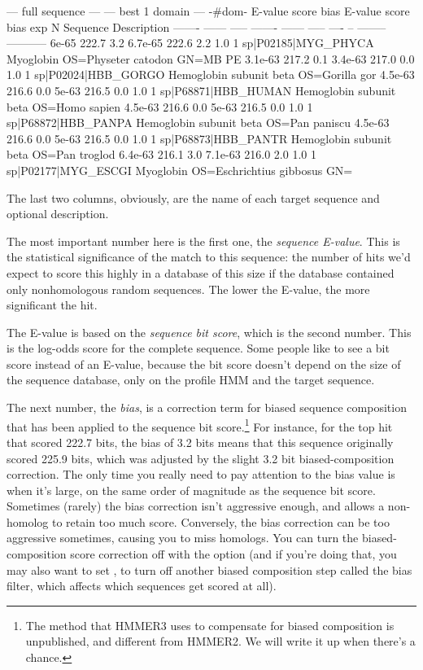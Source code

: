 \begin{sreoutput}
   --- full sequence ---   --- best 1 domain ---    -#dom-
    E-value  score  bias    E-value  score  bias    exp  N  Sequence              Description
    ------- ------ -----    ------- ------ -----   ---- --  --------              -----------
      6e-65  222.7   3.2    6.7e-65  222.6   2.2    1.0  1  sp|P02185|MYG_PHYCA   Myoglobin OS=Physeter catodon GN=MB PE
    3.1e-63  217.2   0.1    3.4e-63  217.0   0.0    1.0  1  sp|P02024|HBB_GORGO   Hemoglobin subunit beta OS=Gorilla gor
    4.5e-63  216.6   0.0      5e-63  216.5   0.0    1.0  1  sp|P68871|HBB_HUMAN   Hemoglobin subunit beta OS=Homo sapien
    4.5e-63  216.6   0.0      5e-63  216.5   0.0    1.0  1  sp|P68872|HBB_PANPA   Hemoglobin subunit beta OS=Pan paniscu
    4.5e-63  216.6   0.0      5e-63  216.5   0.0    1.0  1  sp|P68873|HBB_PANTR   Hemoglobin subunit beta OS=Pan troglod
    6.4e-63  216.1   3.0    7.1e-63  216.0   2.0    1.0  1  sp|P02177|MYG_ESCGI   Myoglobin OS=Eschrichtius gibbosus GN=
 \end{sreoutput}

The last two columns, obviously, are the name of each target sequence
and optional description.

The most important number here is the first one, the \emph{sequence
E-value}. This is the statistical significance of the match to this
sequence: the number of hits we'd expect to score this highly in a
database of this size if the database contained only nonhomologous
random sequences. The lower the E-value, the more significant the hit.

The E-value is based on the \emph{sequence bit score}, which is the
second number. This is the log-odds score for the complete sequence.
Some people like to see a bit score instead of an E-value, because the
bit score doesn't depend on the size of the sequence database, only on
the profile HMM and the target sequence.

The next number, the \emph{bias}, is a correction term for biased
sequence composition that has been applied to the sequence bit
score.\footnote{The method that HMMER3 uses to compensate for biased
  composition is unpublished, and different from HMMER2. We will write
  it up when there's a chance.} For instance, for the top hit
 that scored 222.7 bits, the bias of 3.2 bits means
that this sequence originally scored 225.9 bits, which was adjusted by
the slight 3.2 bit biased-composition correction. The only time you
really need to pay attention to the bias value is when it's large, on
the same order of magnitude as the sequence bit score. Sometimes
(rarely) the bias correction isn't aggressive enough, and allows a
non-homolog to retain too much score. Conversely, the bias correction
can be too aggressive sometimes, causing you to miss homologs. You can
turn the biased-composition score correction off with the
 option (and if you're doing that, you may also want
to set , to turn off another biased composition step
called the bias filter, which affects which sequences get scored at
all).

